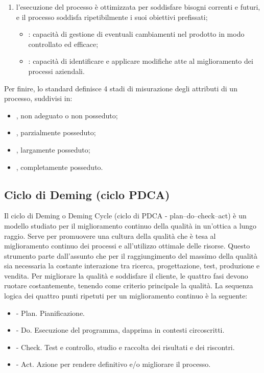 \begin{enumerate}
\begin{itemize}
\end{itemize}
\item  {} l'esecuzione del processo è ottimizzata per soddisfare bisogni correnti e futuri, e il processo soddisfa ripetibilmente i suoi obiettivi prefissati;
\begin{itemize}
\item {}: capacità di gestione di eventuali cambiamenti nel prodotto in modo controllato ed efficace;
\item {}: capacità di identificare e applicare modifiche atte al miglioramento dei processi aziendali.
\end{itemize}
\end{enumerate}
Per finire, lo standard definisce 4 stadi di misurazione degli attributi di un processo, suddivisi in:
\begin{itemize}
\item {}, non adeguato o non posseduto;
\item {}, parzialmente posseduto;
\item {}, largamente posseduto;
\item {}, completamente posseduto.
\end{itemize}

\subsection{Ciclo di Deming (ciclo PDCA)} %

Il ciclo di Deming o Deming Cycle (ciclo di PDCA - plan–do–check–act) è un modello studiato per il miglioramento continuo della qualità in un'ottica a lungo raggio. Serve per promuovere una cultura della qualità che è tesa al miglioramento continuo dei processi e all'utilizzo ottimale delle risorse. Questo strumento parte dall'assunto che per il raggiungimento del massimo della qualità sia necessaria la costante interazione tra ricerca, progettazione, test, produzione e vendita. Per migliorare la qualità e soddisfare il cliente, le quattro fasi devono ruotare costantemente, tenendo come criterio principale la qualità.
La sequenza logica dei quattro punti ripetuti per un miglioramento continuo è la seguente:
\begin{itemize}
\item {} - Plan. Pianificazione.
\item {} - Do. Esecuzione del programma, dapprima in contesti circoscritti.
\item {} - Check. Test e controllo, studio e raccolta dei risultati e dei riscontri.
\item {} - Act. Azione per rendere definitivo e/o migliorare il processo.
\end{itemize}

